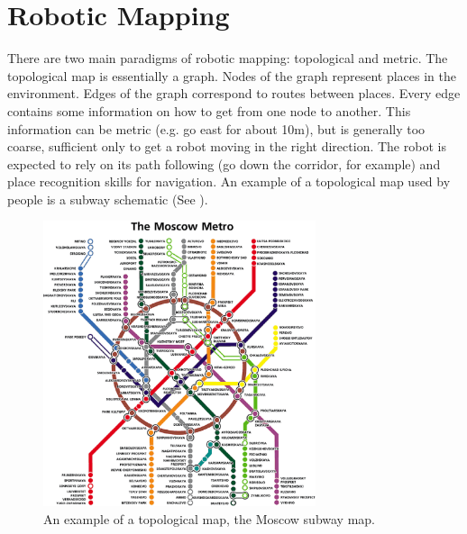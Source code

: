
\nocite{psycho_tversky81}
\nocite{psycho_mcnamara86} 
\nocite{psycho_passini84}
\nocite{psycho_piaget60}

\section{Robotic Mapping}


There are two main paradigms of robotic mapping: topological and
metric. The topological map is essentially a graph.  Nodes of the
graph represent places in the environment. Edges of the graph
correspond to routes between places. Every edge contains some
information on how to get from one node to another. This information
can be metric (e.g. go east for about 10m), but is generally too
coarse, sufficient only to get a robot moving in the right direction.
The robot is expected to rely on its path following (go down the
corridor, for example) and place recognition skills for navigation. An
example of a topological map used by people is a subway schematic (See
).

\begin{figure}[h]
\begin{center}
\includegraphics[width=8cm]{Pics/subway_map}
\end{center}
\caption{An example of a topological map, the Moscow subway map.}
\label{fig:subway}
\end{figure}

